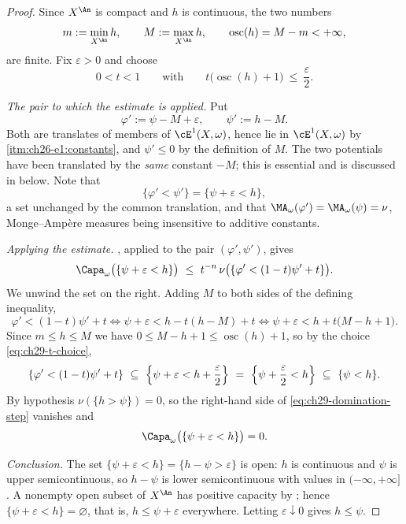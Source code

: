 \begin{proof}
Since \(X^{\An}\) is compact and \(h\) is continuous, the two numbers
\begin{equation}
\label{eq:ch29-h-bounds}
 m:=\min_{X^{\An}}h,\qquad M:=\max_{X^{\An}}h,
 \qquad \operatorname{osc}(h)=M-m<+\infty,
\end{equation}
are finite.  Fix \(\varepsilon>0\) and choose
\begin{equation}
\label{eq:ch29-t-choice}
 0<t<1
 \qquad\text{with}\qquad
 t\bigl(\operatorname{osc}(h)+1\bigr)\ \leq\ \frac\varepsilon2 .
\end{equation}

\emph{The pair to which the estimate is applied.}  Put
\[
 \varphi':=\psi-M+\varepsilon,
 \qquad
 \psi':=h-M .
\]
Both are translates of members of \(\cE^1(X,\omega)\), hence lie in
\(\cE^1(X,\omega)\) by
\,\cref{itm:ch26-e1:constants}, and
\(\psi'\leq0\) by the definition of \(M\).  The two potentials have been
translated by the \emph{same} constant \(-M\); this is essential and is
discussed in  below.  Note that
\[
 \{\varphi'<\psi'\}=\{\psi+\varepsilon<h\},
\]
a set unchanged by the common translation, and that
\(\MA_\omega(\varphi')=\MA_\omega(\psi)=\nu\), Monge--Amp\`ere measures
being insensitive to additive constants.

\emph{Applying the estimate.}  , applied to
the pair \((\varphi',\psi')\), gives
\begin{equation}
\label{eq:ch29-domination-step}
 \Capa_\omega\bigl(\{\psi+\varepsilon<h\}\bigr)
 \ \leq\ t^{-n}\,
   \nu\bigl(\{\varphi'<(1-t)\psi'+t\}\bigr).
\end{equation}
We unwind the set on the right.  Adding \(M\) to both sides of the defining
inequality,
\[
 \varphi'<(1-t)\psi'+t
 \iff
 \psi+\varepsilon<h-t(h-M)+t
 \iff
 \psi+\varepsilon<h+t\bigl(M-h+1\bigr).
\]
Since \(m\leq h\leq M\) we have \(0\leq M-h+1\leq\operatorname{osc}(h)+1\),
so by the choice \eqref{eq:ch29-t-choice},
\[
 \{\varphi'<(1-t)\psi'+t\}
 \ \subseteq\ \Bigl\{\psi+\varepsilon<h+\frac\varepsilon2\Bigr\}
 \ =\ \Bigl\{\psi+\frac\varepsilon2<h\Bigr\}
 \ \subseteq\ \{\psi<h\}.
\]
By hypothesis \(\nu(\{h>\psi\})=0\), so the right-hand side of
\eqref{eq:ch29-domination-step} vanishes and
\[
 \Capa_\omega\bigl(\{\psi+\varepsilon<h\}\bigr)=0 .
\]

\emph{Conclusion.}  The set \(\{\psi+\varepsilon<h\}=\{h-\psi>\varepsilon\}\)
is open: \(h\) is continuous and \(\psi\) is upper semicontinuous, so
\(h-\psi\) is lower semicontinuous with values in
\((-\infty,+\infty]\).  A nonempty open subset of \(X^{\An}\) has positive
capacity by ; hence
\(\{\psi+\varepsilon<h\}=\varnothing\), that is,
\(h\leq\psi+\varepsilon\) everywhere.  Letting
\(\varepsilon\downarrow0\) gives \(h\leq\psi\).
\end{proof}

